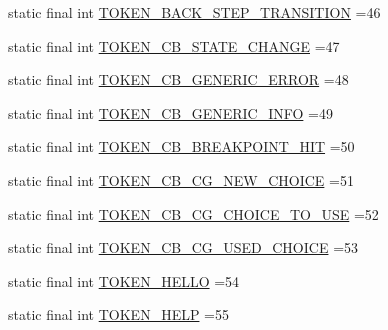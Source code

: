\begin{DoxyCompactItemize}
\item 
static final int \hyperlink{classgov_1_1nasa_1_1jpf_1_1inspector_1_1client_1_1parser_1_1_console_grammar_lexer_a51c007c324b30bdd887e8c4985184d4b}{T\+O\+K\+E\+N\+\_\+\+B\+A\+C\+K\+\_\+\+S\+T\+E\+P\+\_\+\+T\+R\+A\+N\+S\+I\+T\+I\+ON} =46
\item 
static final int \hyperlink{classgov_1_1nasa_1_1jpf_1_1inspector_1_1client_1_1parser_1_1_console_grammar_lexer_a448c82928ad943606b807b730f90dee6}{T\+O\+K\+E\+N\+\_\+\+C\+B\+\_\+\+S\+T\+A\+T\+E\+\_\+\+C\+H\+A\+N\+GE} =47
\item 
static final int \hyperlink{classgov_1_1nasa_1_1jpf_1_1inspector_1_1client_1_1parser_1_1_console_grammar_lexer_a53e4bee17cf3c02f6f640bf1cb4367c5}{T\+O\+K\+E\+N\+\_\+\+C\+B\+\_\+\+G\+E\+N\+E\+R\+I\+C\+\_\+\+E\+R\+R\+OR} =48
\item 
static final int \hyperlink{classgov_1_1nasa_1_1jpf_1_1inspector_1_1client_1_1parser_1_1_console_grammar_lexer_af96da6978affdcd852902d851542e24e}{T\+O\+K\+E\+N\+\_\+\+C\+B\+\_\+\+G\+E\+N\+E\+R\+I\+C\+\_\+\+I\+N\+FO} =49
\item 
static final int \hyperlink{classgov_1_1nasa_1_1jpf_1_1inspector_1_1client_1_1parser_1_1_console_grammar_lexer_aa1e5afb4e7de3c8cbd55b50f24d31b12}{T\+O\+K\+E\+N\+\_\+\+C\+B\+\_\+\+B\+R\+E\+A\+K\+P\+O\+I\+N\+T\+\_\+\+H\+IT} =50
\item 
static final int \hyperlink{classgov_1_1nasa_1_1jpf_1_1inspector_1_1client_1_1parser_1_1_console_grammar_lexer_affba31cc4368538b16cc85aab06a383f}{T\+O\+K\+E\+N\+\_\+\+C\+B\+\_\+\+C\+G\+\_\+\+N\+E\+W\+\_\+\+C\+H\+O\+I\+CE} =51
\item 
static final int \hyperlink{classgov_1_1nasa_1_1jpf_1_1inspector_1_1client_1_1parser_1_1_console_grammar_lexer_a7c6b6d483b92de6c1e8cd469f366be07}{T\+O\+K\+E\+N\+\_\+\+C\+B\+\_\+\+C\+G\+\_\+\+C\+H\+O\+I\+C\+E\+\_\+\+T\+O\+\_\+\+U\+SE} =52
\item 
static final int \hyperlink{classgov_1_1nasa_1_1jpf_1_1inspector_1_1client_1_1parser_1_1_console_grammar_lexer_a4b616a37ac10411cc1fd8500546a5321}{T\+O\+K\+E\+N\+\_\+\+C\+B\+\_\+\+C\+G\+\_\+\+U\+S\+E\+D\+\_\+\+C\+H\+O\+I\+CE} =53
\item 
static final int \hyperlink{classgov_1_1nasa_1_1jpf_1_1inspector_1_1client_1_1parser_1_1_console_grammar_lexer_aa40dd154b413210c8425a14e55657eee}{T\+O\+K\+E\+N\+\_\+\+H\+E\+L\+LO} =54
\item 
static final int \hyperlink{classgov_1_1nasa_1_1jpf_1_1inspector_1_1client_1_1parser_1_1_console_grammar_lexer_aa2fa94d7a5ebb021bdc744d62d414c67}{T\+O\+K\+E\+N\+\_\+\+H\+E\+LP} =55

\end{DoxyCompactItemize}
